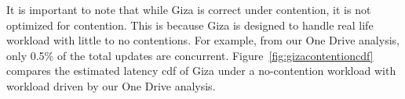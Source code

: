 It is important to note that while Giza is correct under contention, it is not optimized for contention. This is because Giza is designed to handle real life workload with little to no contentions. For example, from our One Drive analysis, only 0.5\% of the total updates are concurrent. Figure~\ref{fig:gizacontentioncdf}  compares the estimated latency cdf of Giza under a no-contention workload with workload driven by our One Drive analysis. 






